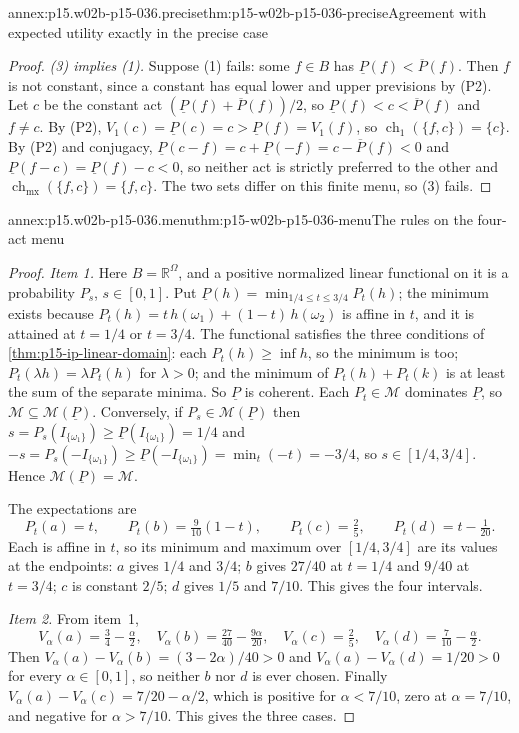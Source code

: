 \begin{annexitem}{annex:p15.w02b-p15-036.precise}{thm:p15-w02b-p15-036-precise}{Agreement with expected utility exactly in the precise case}
\begin{proof}
\emph{(3) implies (1).} Suppose (1) fails: some \(f\in B\) has
\(\underline P(f)<\overline P(f)\). Then \(f\) is not constant, since a
constant has equal lower and upper previsions by (P2). Let \(c\) be the
constant act \((\underline P(f)+\overline P(f))/2\), so
\(\underline P(f)<c<\overline P(f)\) and \(f\ne c\). By (P2),
\(V_1(c)=\underline P(c)=c>\underline P(f)=V_1(f)\), so
\(\operatorname{ch}_1(\{f,c\})=\{c\}\). By (P2) and conjugacy,
\(\underline P(c-f)=c+\underline P(-f)=c-\overline P(f)<0\) and
\(\underline P(f-c)=\underline P(f)-c<0\), so neither act is strictly
preferred to the other and \(\operatorname{ch}_{\mathrm{mx}}(\{f,c\})=
\{f,c\}\). The two sets differ on this finite menu, so (3) fails.
\end{proof}
\end{annexitem}

\begin{annexitem}{annex:p15.w02b-p15-036.menu}{thm:p15-w02b-p15-036-menu}{The rules on the four-act menu}
\begin{proof}
\emph{Item 1.} Here \(B=\mathbb R^\Omega\), and a positive normalized
linear functional on it is a probability \(P_s\), \(s\in[0,1]\). Put
\(\underline P(h)=\min_{1/4\leq t\leq3/4}P_t(h)\); the minimum exists
because \(P_t(h)=t\,h(\omega_1)+(1-t)\,h(\omega_2)\) is affine in \(t\),
and it is attained at \(t=1/4\) or \(t=3/4\). The functional satisfies the
three conditions of \cref{thm:p15-ip-linear-domain}: each \(P_t(h)\geq
\inf h\), so the minimum is too; \(P_t(\lambda h)=\lambda P_t(h)\) for
\(\lambda>0\); and the minimum of \(P_t(h)+P_t(k)\) is at least the sum of
the separate minima. So \(\underline P\) is coherent. Each
\(P_t\in\mathcal M\) dominates \(\underline P\), so
\(\mathcal M\subseteq\mathcal M(\underline P)\). Conversely, if
\(P_s\in\mathcal M(\underline P)\) then
\(s=P_s(I_{\{\omega_1\}})\geq\underline P(I_{\{\omega_1\}})=1/4\) and
\(-s=P_s(-I_{\{\omega_1\}})\geq\underline P(-I_{\{\omega_1\}})
=\min_t(-t)=-3/4\), so \(s\in[1/4,3/4]\). Hence
\(\mathcal M(\underline P)=\mathcal M\).

The expectations are
\[
 P_t(a)=t,\qquad P_t(b)=\tfrac9{10}(1-t),\qquad P_t(c)=\tfrac25,\qquad
 P_t(d)=t-\tfrac1{20}.
\]
Each is affine in \(t\), so its minimum and maximum over \([1/4,3/4]\) are
its values at the endpoints: \(a\) gives \(1/4\) and \(3/4\); \(b\) gives
\(27/40\) at \(t=1/4\) and \(9/40\) at \(t=3/4\); \(c\) is constant
\(2/5\); \(d\) gives \(1/5\) and \(7/10\). This gives the four intervals.

\emph{Item 2.} From item~1,
\[
 V_\alpha(a)=\tfrac34-\tfrac\alpha2,\quad
 V_\alpha(b)=\tfrac{27}{40}-\tfrac{9\alpha}{20},\quad
 V_\alpha(c)=\tfrac25,\quad
 V_\alpha(d)=\tfrac7{10}-\tfrac\alpha2.
\]
Then \(V_\alpha(a)-V_\alpha(b)=(3-2\alpha)/40>0\) and
\(V_\alpha(a)-V_\alpha(d)=1/20>0\) for every \(\alpha\in[0,1]\), so
neither \(b\) nor \(d\) is ever chosen. Finally
\(V_\alpha(a)-V_\alpha(c)=7/20-\alpha/2\), which is positive for
\(\alpha<7/10\), zero at \(\alpha=7/10\), and negative for
\(\alpha>7/10\). This gives the three cases.


\end{proof}
\end{annexitem}
